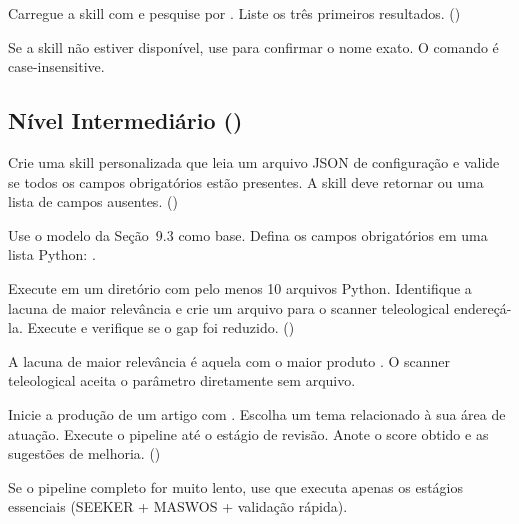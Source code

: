 \begin{exercicio}
Carregue a skill  com
 e pesquise por
. Liste os três primeiros
resultados. (\nivelbasico)

 Se a skill não estiver disponível, use
 para confirmar o nome exato. O comando é
case-insensitive.
\end{exercicio}

\subsection{Nível Intermediário (\nivelintermediario)}
\label{subsec:ex-intermediario}

\begin{exercicio}
Crie uma skill personalizada que leia um arquivo JSON de
configuração e valide se todos os campos obrigatórios estão
presentes. A skill deve retornar  ou uma lista
de campos ausentes. (\nivelintermediario)

 Use o modelo da Seção~9.3 como base. Defina os
campos obrigatórios em uma lista Python: .
\end{exercicio}

\begin{exercicio}
Execute  em um diretório com pelo menos 10
arquivos Python. Identifique a lacuna de maior relevância e crie um
arquivo  para o scanner teleological
endereçá-la. Execute  e verifique se o
gap foi reduzido. (\nivelintermediario)

 A lacuna de maior relevância é aquela com o maior
produto . O scanner
teleological aceita o parâmetro  diretamente sem
arquivo.
\end{exercicio}

\begin{exercicio}
Inicie a produção de um artigo com . Escolha
um tema relacionado à sua área de atuação. Execute o pipeline até o
estágio de revisão. Anote o score obtido e as sugestões de melhoria.
(\nivelintermediario)

 Se o pipeline completo for muito lento, use
 que executa apenas os estágios
essenciais (SEEKER + MASWOS + validação rápida).
\end{exercicio}

